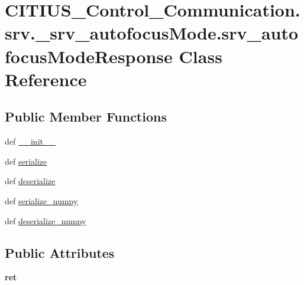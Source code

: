 \hypertarget{class_c_i_t_i_u_s___control___communication_1_1srv_1_1__srv__autofocus_mode_1_1srv__autofocus_mode_response}{\section{\-C\-I\-T\-I\-U\-S\-\_\-\-Control\-\_\-\-Communication.\-srv.\-\_\-srv\-\_\-autofocus\-Mode.\-srv\-\_\-autofocus\-Mode\-Response \-Class \-Reference}
\label{class_c_i_t_i_u_s___control___communication_1_1srv_1_1__srv__autofocus_mode_1_1srv__autofocus_mode_response}
}
\subsection*{\-Public \-Member \-Functions}
\begin{DoxyCompactItemize}
\item 
def \hyperlink{class_c_i_t_i_u_s___control___communication_1_1srv_1_1__srv__autofocus_mode_1_1srv__autofocus_mode_response_a324b414171968727d35be449c3cad33b}{\-\_\-\-\_\-init\-\_\-\-\_\-}
\item 
def \hyperlink{class_c_i_t_i_u_s___control___communication_1_1srv_1_1__srv__autofocus_mode_1_1srv__autofocus_mode_response_ad5948c94358a66c95b5b33fe72a91ea0}{serialize}
\item 
def \hyperlink{class_c_i_t_i_u_s___control___communication_1_1srv_1_1__srv__autofocus_mode_1_1srv__autofocus_mode_response_a2fc82d372e0d1bde02d47ec502370e32}{deserialize}
\item 
def \hyperlink{class_c_i_t_i_u_s___control___communication_1_1srv_1_1__srv__autofocus_mode_1_1srv__autofocus_mode_response_aa757e7d8a9f17cad242d4719647d6288}{serialize\-\_\-numpy}
\item 
def \hyperlink{class_c_i_t_i_u_s___control___communication_1_1srv_1_1__srv__autofocus_mode_1_1srv__autofocus_mode_response_a52b02cc82bcaf7ca10f696b8daf78966}{deserialize\-\_\-numpy}
\end{DoxyCompactItemize}
\subsection*{\-Public \-Attributes}
\begin{DoxyCompactItemize}
\item 
\hypertarget{class_c_i_t_i_u_s___control___communication_1_1srv_1_1__srv__autofocus_mode_1_1srv__autofocus_mode_response_aa7a614737bc1bc01343cace5d8956c3a}{{\bfseries ret}}\label{class_c_i_t_i_u_s___control___communication_1_1srv_1_1__srv__autofocus_mode_1_1srv__autofocus_mode_response_aa7a614737bc1bc01343cace5d8956c3a}

\end{DoxyCompactItemize}
